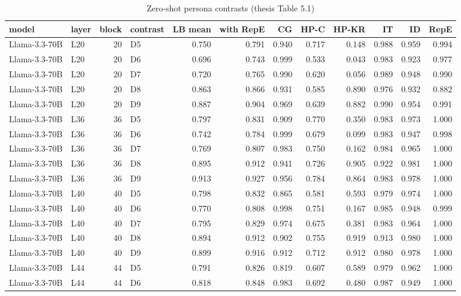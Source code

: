 \begin{table}
\caption{Zero-shot persona contrasts (thesis Table 5.1)}
\label{tab:x-zero_shot}
\begin{tabular}{llrlrrrrrrrr}
\toprule
model & layer & block & contrast & LB mean & with RepE & CG & HP-C & HP-KR & IT & ID & RepE \\
\midrule
Llama-3.3-70B & L20 & 20 & D5 & 0.750 & 0.791 & 0.940 & 0.717 & 0.148 & 0.988 & 0.959 & 0.994 \\
Llama-3.3-70B & L20 & 20 & D6 & 0.696 & 0.743 & 0.999 & 0.533 & 0.043 & 0.983 & 0.923 & 0.977 \\
Llama-3.3-70B & L20 & 20 & D7 & 0.720 & 0.765 & 0.990 & 0.620 & 0.056 & 0.989 & 0.948 & 0.990 \\
Llama-3.3-70B & L20 & 20 & D8 & 0.863 & 0.866 & 0.931 & 0.585 & 0.890 & 0.976 & 0.932 & 0.882 \\
Llama-3.3-70B & L20 & 20 & D9 & 0.887 & 0.904 & 0.969 & 0.639 & 0.882 & 0.990 & 0.954 & 0.991 \\
Llama-3.3-70B & L36 & 36 & D5 & 0.797 & 0.831 & 0.909 & 0.770 & 0.350 & 0.983 & 0.973 & 1.000 \\
Llama-3.3-70B & L36 & 36 & D6 & 0.742 & 0.784 & 0.999 & 0.679 & 0.099 & 0.983 & 0.947 & 0.998 \\
Llama-3.3-70B & L36 & 36 & D7 & 0.769 & 0.807 & 0.983 & 0.750 & 0.162 & 0.984 & 0.965 & 1.000 \\
Llama-3.3-70B & L36 & 36 & D8 & 0.895 & 0.912 & 0.941 & 0.726 & 0.905 & 0.922 & 0.981 & 1.000 \\
Llama-3.3-70B & L36 & 36 & D9 & 0.913 & 0.927 & 0.956 & 0.784 & 0.864 & 0.983 & 0.978 & 1.000 \\
Llama-3.3-70B & L40 & 40 & D5 & 0.798 & 0.832 & 0.865 & 0.581 & 0.593 & 0.979 & 0.974 & 1.000 \\
Llama-3.3-70B & L40 & 40 & D6 & 0.770 & 0.808 & 0.998 & 0.751 & 0.167 & 0.985 & 0.948 & 0.999 \\
Llama-3.3-70B & L40 & 40 & D7 & 0.795 & 0.829 & 0.974 & 0.675 & 0.381 & 0.983 & 0.964 & 1.000 \\
Llama-3.3-70B & L40 & 40 & D8 & 0.894 & 0.912 & 0.902 & 0.755 & 0.919 & 0.913 & 0.980 & 1.000 \\
Llama-3.3-70B & L40 & 40 & D9 & 0.899 & 0.916 & 0.912 & 0.712 & 0.912 & 0.980 & 0.978 & 1.000 \\
Llama-3.3-70B & L44 & 44 & D5 & 0.791 & 0.826 & 0.819 & 0.607 & 0.589 & 0.979 & 0.962 & 1.000 \\
Llama-3.3-70B & L44 & 44 & D6 & 0.818 & 0.848 & 0.983 & 0.692 & 0.480 & 0.987 & 0.949 & 1.000 \\

\end{tabular}
\end{table}
